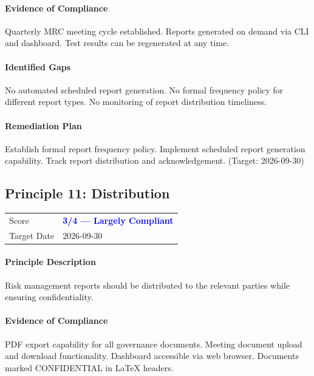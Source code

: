\documentclass[11pt]{article}
\begin{document}
\paragraph{Evidence of Compliance}
Quarterly MRC meeting cycle established. Reports generated on demand via CLI and dashboard. Test results can be regenerated at any time.

\paragraph{Identified Gaps}
No automated scheduled report generation. No formal frequency policy for different report types. No monitoring of report distribution timeliness.

\paragraph{Remediation Plan}
Establish formal report frequency policy. Implement scheduled report generation capability. Track report distribution and acknowledgement. (Target: 2026-09-30)

\subsection{Principle 11: Distribution}

\begin{table}[H]
    \centering
    \begin{tabular}{ll}
        \toprule
        Score & \textcolor{blue}{\textbf{3/4 --- Largely Compliant}} \\
        Target Date & 2026-09-30 \\
        \bottomrule
    \end{tabular}
\end{table}

\paragraph{Principle Description}
Risk management reports should be distributed to the relevant parties while ensuring confidentiality.

\paragraph{Evidence of Compliance}
PDF export capability for all governance documents. Meeting document upload and download functionality. Dashboard accessible via web browser. Documents marked CONFIDENTIAL in LaTeX headers.
\end{document}
